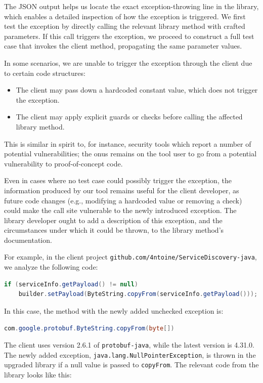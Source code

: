 The JSON output helps us locate the exact exception-throwing line in the library, which enables a detailed inspection of how the exception is triggered. We first test the exception by directly calling the relevant library method with crafted parameters. If this call triggers the exception, we proceed to construct a full test case that invokes the client method, propagating the same parameter values.

In some scenarios, we are unable to trigger the exception through the client due to certain code structures:
\begin{itemize}
  \item The client may pass down a hardcoded constant value, which does not trigger the exception.
  \item The client may apply explicit guards or checks before calling the affected library method.
\end{itemize}

This is similar in spirit to, for instance, security tools which report a number of potential vulnerabilities; the onus remains on the tool user to go from a potential vulnerability to proof-of-concept code.

Even in cases where no test case could possibly trigger the exception, the information produced by our tool remains useful for the client developer, as future code changes (e.g., modifying a hardcoded value or removing a check) could make the call site vulnerable to the newly introduced exception. The library developer ought to add a description of this exception, and the circumstances under which it could be thrown, to the library method's documentation.

For example, in the client project \texttt{github.com/4ntoine/ServiceDiscovery-java}, we analyze the following code:

\begin{lstlisting}[language=Java, basicstyle=\scriptsize\ttfamily, breaklines=true]
if (serviceInfo.getPayload() != null)
    builder.setPayload(ByteString.copyFrom(serviceInfo.getPayload()));
\end{lstlisting}

In this case, the method with the newly added unchecked exception is:

\begin{lstlisting}[language=Java, basicstyle=\scriptsize\ttfamily]
com.google.protobuf.ByteString.copyFrom(byte[])
\end{lstlisting}

The client uses version 2.6.1 of \texttt{protobuf-java}, while the latest version is 4.31.0. The newly added exception, \texttt{java.lang.NullPointerException}, is thrown in the upgraded library if a null value is passed to \texttt{copyFrom}. The relevant code from the library looks like this:

